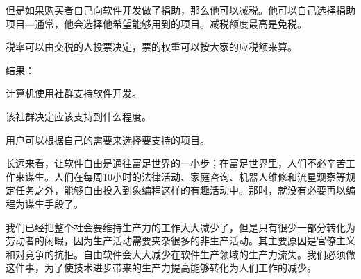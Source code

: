 但是如果购买者自己向软件开发做了捐助，那么他可以减税。他可以自己选择捐助项目—通常，他会选择他希望能够用到的项目。减税额度最高是免税。\par
税率可以由交税的人投票决定，票的权重可以按大家的应税额来算。\par
结果：\par
计算机使用社群支持软件开发。\par
该社群决定应该支持到什么程度。\par
用户可以根据自己的需要来选择要支持的项目。\par
长远来看，让软件自由是通往富足世界的一小步；在富足世界里，人们不必辛苦工作来谋生。人们在每周10小时的法律活动、家庭咨询、机器人维修和流星观察等规定任务之外，能够自由投入到象编程这样的有趣活动中。那时，就没有必要再以编程为谋生手段了。\par
我们已经把整个社会要维持生产力的工作大大减少了，但是只有很少一部分转化为劳动者的闲暇，因为生产活动需要夹杂很多的非生产活动。其主要原因是官僚主义和对竞争的抗拒。自由软件会大大减少在软件生产领域的生产力流失。我们必须做这件事，为了使技术进步带来的生产力提高能够转化为人们工作的减少。